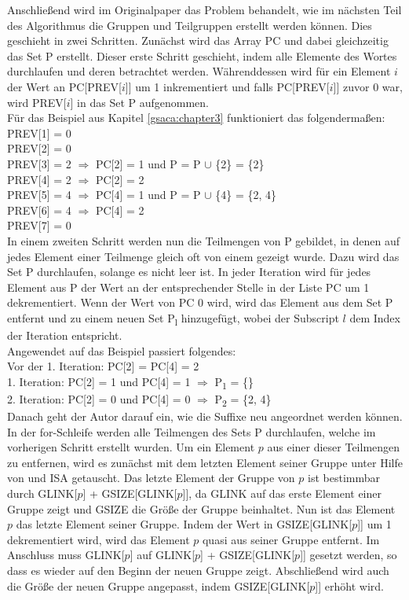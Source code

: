 Anschließend wird im Originalpaper das Problem behandelt, wie im nächsten Teil des Algorithmus die Gruppen und Teilgruppen erstellt werden können. 
Dies geschieht in zwei Schritten. 
Zunächst wird das Array PC und dabei gleichzeitig das Set P erstellt. 
Dieser erste Schritt geschieht, indem alle Elemente des Wortes durchlaufen und deren \prevpointer betrachtet werden. 
Währenddessen wird für ein Element $i$ der Wert an PC[PREV[$i$]] um 1 inkrementiert und falls PC[PREV[$i$]] zuvor 0 war, wird PREV[$i$] in das Set P aufgenommen.\\
Für das Beispiel aus Kapitel \ref{gsaca:chapter3} funktioniert das folgendermaßen:\\
PREV[1] = 0\\
PREV[2] = 0\\
PREV[3] = 2 $\Rightarrow$ PC[2] = 1 und P = P $\cup$ \{2\} = \{2\}\\
PREV[4] = 2 $\Rightarrow$ PC[2] = 2\\
PREV[5] = 4 $\Rightarrow$ PC[4] = 1 und P = P $\cup$ \{4\} = \{2, 4\}\\
PREV[6] = 4 $\Rightarrow$ PC[4] = 2\\
PREV[7] = 0\\
In einem zweiten Schritt werden nun die Teilmengen von P gebildet, in denen auf jedes Element einer Teilmenge gleich oft von einem \prevpointer gezeigt wurde. 
Dazu wird das Set P durchlaufen, solange es nicht leer ist. 
In jeder Iteration wird für jedes Element aus P der Wert an der entsprechender Stelle in der Liste PC um 1 dekrementiert. 
Wenn der Wert von PC 0 wird, wird das Element aus dem Set P entfernt und zu einem neuen Set P\textsubscript{l} hinzugefügt, wobei der Subscript $l$ dem Index der Iteration entspricht. \\
Angewendet auf das Beispiel passiert folgendes:\\
Vor der 1. Iteration: PC[2] = PC[4] = 2\\
1. Iteration: PC[2] = 1 und PC[4] = 1 $\Rightarrow$ P\textsubscript{1} = \{\} \\
2. Iteration: PC[2] = 0 und PC[4] = 0 $\Rightarrow$ P\textsubscript{2} = \{2, 4\}\\

Danach geht der Autor darauf ein, wie die Suffixe neu angeordnet werden können. 
In der for-Schleife werden alle Teilmengen des Sets P durchlaufen, welche im vorherigen Schritt erstellt wurden. 
Um ein Element $p$ aus einer dieser Teilmengen zu entfernen, wird es zunächst mit dem letzten Element seiner Gruppe unter Hilfe von \sa und ISA getauscht. 
Das letzte Element der Gruppe von $p$ ist bestimmbar durch GLINK[$p$] + GSIZE[GLINK[$p$]], da GLINK auf das erste Element einer Gruppe zeigt und GSIZE die Größe der Gruppe beinhaltet. 
Nun ist das Element $p$ das letzte Element seiner Gruppe. 
Indem der Wert in GSIZE[GLINK[$p$]] um 1 dekrementiert wird, wird das Element $p$ quasi aus seiner Gruppe entfernt. 
Im Anschluss muss GLINK[$p$] auf GLINK[$p$] + GSIZE[GLINK[$p$]] gesetzt werden, so dass es wieder auf den Beginn der neuen Gruppe zeigt. 
Abschließend wird auch die Größe der neuen Gruppe angepasst, indem GSIZE[GLINK[$p$]] erhöht wird.\\

